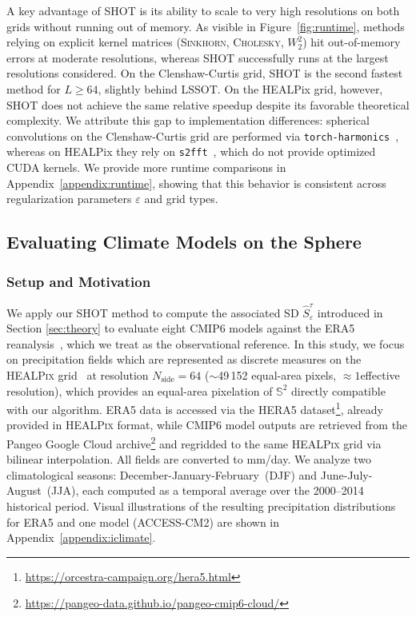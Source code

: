 \documentclass{article}
\theoremstyle{plain}
\theoremstyle{definition}
\theoremstyle{remark}
\newcommand{\ph}[1]{{\color{blue}{#1}}}
\begin{document}
A key advantage of \textsc{SHOT} is its ability to scale to very high resolutions on both grids without running out of memory.
As visible in Figure~\ref{fig:runtime}, methods relying on explicit kernel matrices (\textsc{Sinkhorn}, \textsc{Cholesky}, $W_2^2$) hit out-of-memory errors at moderate resolutions, whereas \textsc{SHOT} successfully runs at the largest resolutions considered. On the Clenshaw-Curtis grid, \textsc{SHOT} is the second fastest method for $L \geq 64$, slightly behind \textsc{LSSOT}.
On the HEALPix grid, however, \textsc{SHOT} does not achieve the same relative speedup despite its favorable theoretical complexity.
We attribute this gap to implementation differences: spherical convolutions on the Clenshaw-Curtis grid are performed via \texttt{torch-harmonics}~\cite{bonev2023spherical}, whereas on HEALPix they rely on \texttt{s2fft}~\cite{price2024differentiable}, which do not provide optimized CUDA kernels. We provide more runtime comparisons in Appendix~\ref{appendix:runtime}, showing that this behavior is consistent across regularization parameters $\varepsilon$ and grid types.

\subsection{Evaluating Climate Models on the Sphere}

\subsubsection{Setup and Motivation}
\label{sec:setup}

We apply our \textsc{SHOT} method to compute the associated SD $\hat{S}^\tau_\varepsilon$ introduced in Section \ref{sec:theory} to evaluate eight CMIP6 models against the
ERA5 reanalysis~\cite{hersbach2020era5}, which we treat as the
observational reference. In this study, we focus on precipitation fields which are represented as
discrete measures on the \textsc{HEALPix} grid~\cite{gorski2005healpix}
at resolution $N_\mathrm{side} = 64$ ($\sim$49\,152 equal-area pixels,
$\approx 1$\textdegree effective resolution), which provides an
equal-area pixelation of $\mathbb{S}^2$ directly compatible with our
algorithm. ERA5 data is accessed via the HERA5
dataset\footnote{\url{https://orcestra-campaign.org/hera5.html}}, already provided in \textsc{HEALPix} format,
while CMIP6 model outputs are retrieved from the Pangeo Google Cloud
archive\footnote{\url{https://pangeo-data.github.io/pangeo-cmip6-cloud/}} and regridded to the same
\textsc{HEALPix} grid via bilinear interpolation. All fields are
converted to mm/day. We analyze two
climatological seasons: December-January-February~(DJF) and
June-July-August~(JJA), each computed as a temporal average over
the 2000--2014 historical period. Visual illustrations of the resulting
precipitation distributions for ERA5 and one model (ACCESS-CM2) are shown in
Appendix~\ref{appendix:iclimate}.
\end{document}
